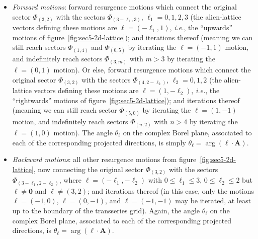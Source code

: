\documentclass[11pt,a4paper]{article}
\begin{document}
\begin{itemize}
%
\item \textit{Forward motions}: forward resurgence motions which connect the original sector $\Phi_{(3,2)}$ with the sectors $\Phi_{(3-\ell_{1},3)}$, $\ell_{1}=0,1,2,3$ (the alien-lattice vectors defining these motions are $\boldsymbol{\ell}=\left(-\ell_{1},1\right)$, \textit{i.e.}, the ``upwards'' motions of figure~\ref{fig:sec5-2d-lattice}); and iterations thereof (meaning we can still reach sectors $\Phi_{(1,4)}$ and $\Phi_{(0,5)}$ by iterating the $\boldsymbol{\ell}=\left(-1,1\right)$ motion, and indefinitely reach sectors $\Phi_{(3,m)}$ with $m>3$ by iterating the $\boldsymbol{\ell}=\left(0,1\right)$ motion). Or else, forward resurgence motions which connect the original sector $\Phi_{(3,2)}$ with the sectors $\Phi_{(4,2-\ell_{2})}$, $\ell_{2}=0,1,2$ (the alien-lattice vectors defining these motions are $\boldsymbol{\ell}=\left(1,-\ell_{2}\right)$, \textit{i.e.}, the ``rightwards'' motions of figure~\ref{fig:sec5-2d-lattice}); and iterations thereof (meaning we can still reach sector $\Phi_{(5,0)}$ by iterating the $\boldsymbol{\ell}=\left(1,-1\right)$ motion, and indefinitely reach sectors $\Phi_{(n,2)}$ with $n>4$ by iterating the $\boldsymbol{\ell}=\left(1,0\right)$ motion). The angle $\theta_{\boldsymbol{\ell}}$ on the complex Borel plane, associated to each of the corresponding projected directions, is simply $\theta_{\boldsymbol{\ell}} = \arg \left( \boldsymbol{\ell} \cdot \boldsymbol{A} \right)$. 
%
\item \textit{Backward motions}: all other resurgence motions from figure~\ref{fig:sec5-2d-lattice}, now connecting the original sector $\Phi_{(3,2)}$ with the  sectors $\Phi_{(3-\ell_{1},2-\ell_{2})}$, where $\boldsymbol{\ell}=\left(-\ell_{1},-\ell_{2}\right)$ with $0 \le \ell_1 \le 3$, $0 \le \ell_2 \le 2$ but $\boldsymbol{\ell} \ne \boldsymbol{0}$ and $\boldsymbol{\ell} \ne (3,2)$; and iterations thereof (in this case, only the motions $\boldsymbol{\ell}=\left(-1,0\right)$, $\boldsymbol{\ell}=\left(0,-1\right)$, and $\boldsymbol{\ell}=\left(-1,-1\right)$ may be iterated, at least up to the boundary of the transseries grid). Again, the angle $\theta_{\boldsymbol{\ell}}$ on the complex Borel plane, associated to each of the corresponding projected directions, is $\theta_{\boldsymbol{\ell}} = \arg \left( \boldsymbol{\ell} \cdot \boldsymbol{A} \right)$. 
%
\end{itemize}
\end{document}

